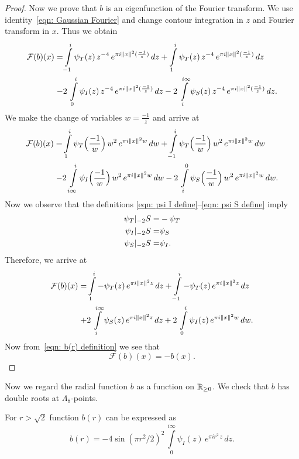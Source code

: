 \begin{proof}
Now we prove that $b$ is an eigenfunction of the Fourier transform. We use identity~\eqref{eqn: Gaussian Fourier} and change contour integration in $z$ and Fourier transform in $x$. Thus we obtain
\begin{align}
  \mathcal{F}(b)(x)= & \int\limits_{-1}^{i}\psi_T(z)\,z^{-4}\,e^{\pi i \|x\|^2 (\frac{-1}{z})}\,dz
    + \int\limits_{1}^{i}\psi_T(z)\,z^{-4}\,e^{\pi i \|x\|^2 (\frac{-1}{z})}\,dz \notag \\
  -& 2\,\int\limits_{0}^{i}\psi_I(z)\,z^{-4}\,e^{\pi i \|x\|^2 (\frac{-1}{z})}\,dz
  - 2\,\int\limits_{i}^{i\infty}\psi_S(z)\,z^{-4}\,e^{\pi i \|x\|^2 (\frac{-1}{z})}\,dz. \notag
\end{align}
We make the change of variables $w=\frac{-1}{z}$ and arrive at
\begin{align}
  \mathcal{F}(b)(x)= & \int\limits_{1}^{i}\psi_T\Big(\frac{-1}{w}\Big)\,w^{2}\,e^{\pi i \|x\|^2 w}\,dw
    + \int\limits_{-1}^{i}\psi_T\Big(\frac{-1}{w}\Big)\,w^{2}\,e^{\pi i \|x\|^2 w}\,dw \notag \\
  -& 2\,\int\limits_{i\infty}^{i}\psi_I\Big(\frac{-1}{w}\Big)\,w^{2}\,e^{\pi i \|x\|^2 w}\,dw
  - 2\,\int\limits_{i}^{0}\psi_S\Big(\frac{-1}{w}\Big)\,w^{2}\,e^{\pi i \|x\|^2 w}\,dw.\notag
\end{align}
Now we observe that the definitions \eqref{eqn: psi I define}--\eqref{eqn: psi S define}   imply
\begin{align}\psi_T|_{-2}S=&-\psi_T \notag \\
\psi_I|_{-2}S=&\psi_S \notag \\
\psi_S|_{-2}S=&\psi_I. \notag
\end{align}
Therefore, we arrive at
\begin{align}
  \mathcal{F}(b)(x)= & \int\limits_{1}^{i}-\psi_T(z)\,e^{\pi i \|x\|^2 z}\,dz
    + \int\limits_{-1}^{i}-\psi_T(z)\,e^{\pi i \|x\|^2 z}\,dz \notag \\
  +& 2\,\int\limits_{i}^{i\infty}\psi_S(z)\,e^{\pi i \|x\|^2 z}\,dz
  + 2\,\int\limits_{0}^{i}\psi_I(z)\,e^{\pi i \|x\|^2 w}\,dw.\notag
\end{align}
Now from~\eqref{eqn: b(r) definition} we see that
$$ \mathcal{F}(b)(x)=-b(x). $$
\end{proof}
Now we regard the radial function  $b$ as a function on $\mathbb{R}_{\geq0}$. We check that $b$ has double roots at $\Lambda_8$-points.
\begin{proposition}\label{prop: b(r) double zeroes}
For $r>\sqrt{2}$ function $b(r)$ can be expressed as
\begin{equation}\label{eqn: b double zeroes}
  b(r)=-4\sin(\pi r^2/2)^2\,\int\limits_{0}^{i\infty}\psi_I(z)\,e^{\pi i r^2 \,z}\,dz.
\end{equation}
\end{proposition}
